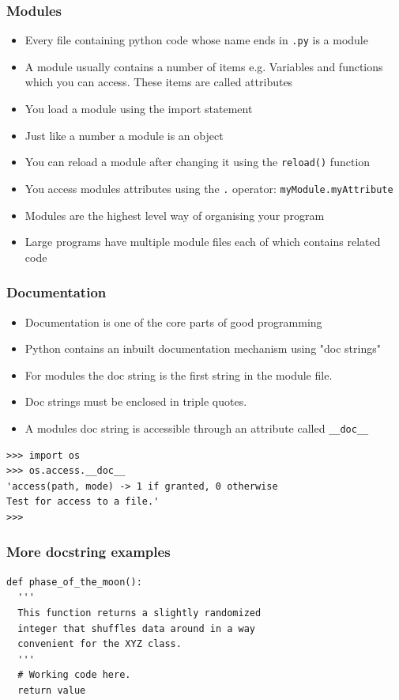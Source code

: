 \documentclass{beamer}
\begin{document}
\begin{frame}
\frametitle{Modules}
\begin{itemize}
\item Every file containing python code whose name ends in \texttt{.py} is a module
\item A module usually contains a number of items e.g. Variables and functions which you can access. These items are called attributes
\item You load a module using the import statement
\item Just like a number a module is an object
\item You can reload a module after changing it using the \texttt{reload()} function
\item You access modules attributes using the \texttt{.} operator: \texttt{myModule.myAttribute}
\item Modules are the highest level way of organising your program
\item Large programs have multiple module files each of which contains related code
\end{itemize}
\end{frame}

\begin{frame}[containsverbatim]
\frametitle{Documentation}
\begin{itemize}
\item Documentation is one of the core parts of good programming
\item Python contains an inbuilt documentation mechanism using "doc strings"
\item For modules the doc string is the first string in the module file.
\item Doc strings must be enclosed in triple quotes.
\item A modules doc string is accessible through an attribute called \texttt{\_\_doc\_\_}
\end{itemize}
\tiny
\begin{Verbatim}
>>> import os
>>> os.access.__doc__
'access(path, mode) -> 1 if granted, 0 otherwise
Test for access to a file.'
>>>
\end{Verbatim}
\normalsize
\end{frame}

\begin{frame}[containsverbatim]
\frametitle{More docstring examples}
\begin{lstlisting}
def phase_of_the_moon():
  '''
  This function returns a slightly randomized
  integer that shuffles data around in a way
  convenient for the XYZ class.
  '''
  # Working code here.
  return value 
\end{lstlisting}
\end{frame}
\end{document}
